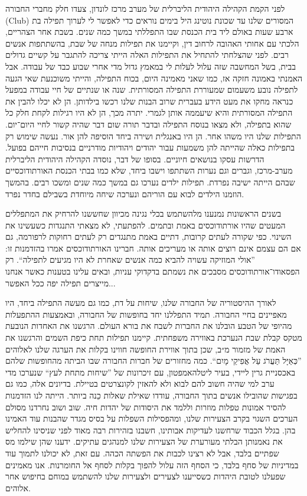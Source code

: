 \documentclass[14pt, article, extrafontsizes, twopage, a4paper]{memoir}
\begin{document}
לפני הקמת הקהילה היהודית הליברלית של מערב מרכז לונדון, צעדו חלק מחברי החבורה (\textenglish{Club}) המסורים שלנו עד שכונת נוטינג היל בימים נוראים כדי לאפשר לי לערוך תפילה בת ארבע שעות באולם ליד בית הכנסת שבו התפללתי במשך כמה שנים. בשבת אחר הצהריים, הלכתי עם אחותי האהובה לרחוב דין, וקיימנו את תפילות מנחה של שבת, בהשתתפות אנשים רבים. לפני שהצלחתי להתחיל את התפילות האלה הייתי צריכה להתגבר על קשיים גדולים בבית, בשל המחשבה שזה עלול לעלות לי במאמץ גדול מדי אחרי שבוע כבד של עבודה. אבל האמנתי באמונה חזקה אז, כמו שאני מאמינה היום, בכוח התפילה, והייתי משוכנעת שאי הגעה לתפילה נובע משעמום שמעוררת התפילה המסורתית. שנה או שנתיים של חיי עבודה  במפעל כנראה מחקו את מעט הידע בעברית שרוב הבנות שלנו רכשו בילדותן. הן לא יכלו להבין את התפילה המסורתית והיא שיעממה אותן לגמרי. יתרה מכך, הן לא היו רגילות לקחת חלק כל שהוא בתפילה, ולא מצאו בנוסח התפילה ובדבר תורה שום דבר שהיה קשור לחיי היום־יום. התפילות שלנו היו משהו אחר. הן היו באנגלית ושירה ביחד הוסיפה להן אור. נעשה שימוש רק בתפילות כאלה שהייתה להן משמעות עבור יהודים ויהודיות מודרניים בנסיבות חייהם בפועל. הדרשות עסקו בנושאים חיוניים. בסופו של דבר, נוסדה הקהילה היהודית הליברלית מערב-מרכז, וגברים וגם נערות השתתפו וישבו ביחד, שלא כמו בבתי הכנסת האורתודוכסיים  שבהם הייתה ישיבה נפרדת. תפילות ילדים נערכו גם במשך כמה שנים ומשכו רבים. בהמשך הוזמנו הילדים לבוא עם הוריהם ונערכה שיחה מיוחדת בשבילם בחדר נפרד.

בשנים הראשונות נמנענו מלהשתמש בכלי נגינה מכיוון שחששנו להרחיק את המתפללים המעטים שהיו אורתודוכסים באמת ובתמים. להפתעתי, לא מצאתי התנגדות כשעשינו את השינוי. כפי שקורה לעתים קרובות, דתיים באמת מתנגדים רק לעתים רחוקות לרפורמה, גם אם הם עצמם אינם רוצים אותה או מעריכים אותה. חברינו האורתודוכסים אמרו בהזדמנות זו: ”אולי המוזיקה עשויה להביא כמה אנשים שאחרת לא היו מגיעים לתפילה“. רק הפסאודו־אורתודוכסים מסבכים את נשמתם בדקדוקי עניות, ובאים עלינו בטענות כאשר אנחנו מייצרים תפילה יפה ככל האפשר...

לאורך ההיסטוריה של החבורה שלנו, שיחות על דת, כמו גם מעשה התפילה ביחד, היו מאפיינים בחיי החבורה. תמיד התפללנו יחד בחופשות של החבורה, ובאמצעות ההתפעלות מהיופי של הטבע הובלנו את החברות לשבח את בורא העולם. הרגשנו את האחדות הנובעת מטקס קבלת שבת הנערכת באווירה משפחתית. קיימנו תפילות תחת כיפת השמים והרגשנו את האמת של מזמור מ״ב, שכן בתוך אווירת החופשה חווינו בקלות את הערגה שלנו לאלוהים ”כְּאַיָּל תַּעֲרֹג עַל אֲפִיקֵי מָיִם“. כמה מחזורים של חברות החבורה שבו הביתה מהחופשות שלהם באכסניית גרין ליידי, בעיר ליטלהאמפטון, עם זיכרונות של ”שיחות מתחת לעץ“ שנערכו מדי ערב למי שהיה חשוב להם לבוא ולא להאזין לקונצרטים בטיילת. בדיונים אלה, כמו גם בפגישות שהובילו אנשים בתוך החבורה, עודדו שאילת שאלות כֵנה ביותר. הייתה לנו הזדמנות להסיר אמונות טפלות מוזרות וללמד את היסודות של יהדות חיה. שוב ושוב נחרדנו מסולם הערכים השגוי בקרב הצעירות שלנו, ומהפסילות השפלות על בסיס מגדר שהבנות עוד האמינו בהן. בגלל הכבוד שרחשנו לעדיקות אבותינו, חשבנו בזהירות רבה מאוד לפני שניסינו להחליש את נאמנותן הבלתי מעורערת של הצעירות שלנו למנהגים עתיקים. ידענו שהן שילמו מס שפתיים בלבד, אבל לא רצינו לכבות את הפשתה הכהה. עם זאת, לא יכולנו לתמוך עוד במדיניות של סחף בלבד, כי הסחף הזה עלול להפוך בקלות לסחף אל החומרנות. אנו מאמינים שפעלנו לטובת היהדות כשסייענו לצעירים ולצעירות שלנו להשתמש במוחם בחיפוש אחר אלוהים.
\end{document}
